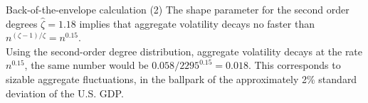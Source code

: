 \documentclass{beamer}
\begin{document}

\begin{frame}{Back-of-the-envelope calculation (2)}
    \justifying
    The shape parameter for the second order degrees $\hat{\zeta} = 1.18$
    implies that aggregate volatility decays no faster than $n^{(\zeta-1) / \zeta} = n^{0.15}$. \\[10pt]
    
    Using the second-order degree distribution,
    aggregate volatility decays at the rate $n^{0.15}$, the same number would be
    $0.058/2295^{0.15}=0.018$. This corresponds to sizable aggregate fluctuations, in
    the ballpark of the approximately 2\% standard deviation of the U.S. GDP.
\end{frame}
\end{document}
